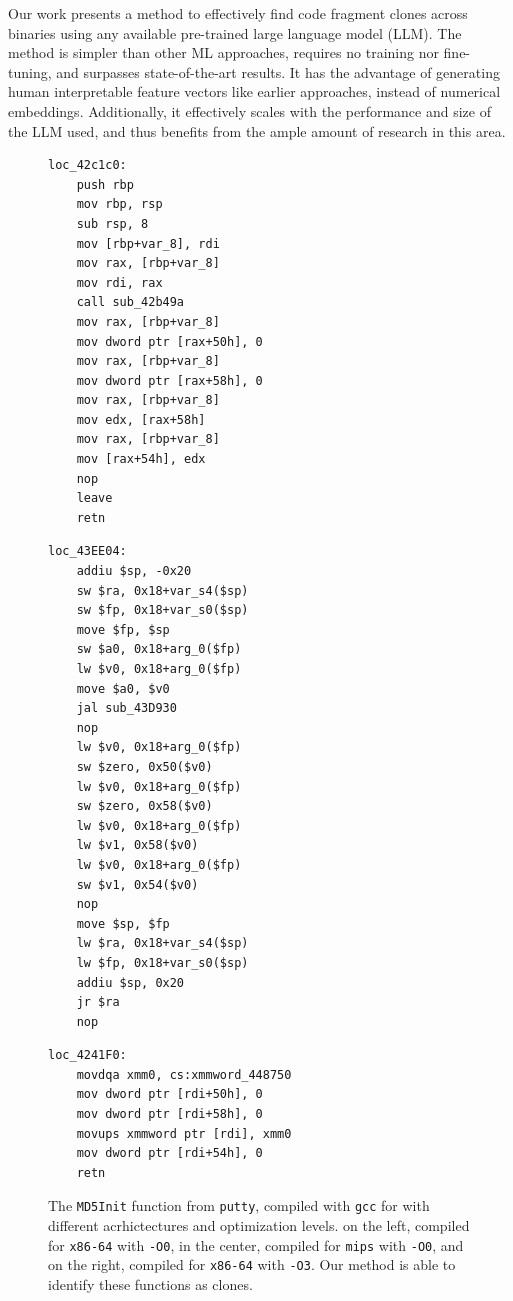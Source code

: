 Our work presents a method to effectively find code fragment clones across binaries using any available pre-trained
large language model (LLM). The method is simpler than other ML approaches, requires no training nor fine-tuning, and
surpasses state-of-the-art results. It has the advantage of generating human interpretable feature vectors like earlier approaches,
instead of numerical embeddings. Additionally, it effectively scales with the performance and size of the LLM used, and thus
benefits from the ample amount of research in this area.

\begin{figure}
\centering
\begin{minipage}[t]{0.32\linewidth}
\centering
\begin{verbatim}
loc_42c1c0:
    push rbp
    mov rbp, rsp
    sub rsp, 8
    mov [rbp+var_8], rdi
    mov rax, [rbp+var_8]
    mov rdi, rax
    call sub_42b49a
    mov rax, [rbp+var_8]
    mov dword ptr [rax+50h], 0
    mov rax, [rbp+var_8]
    mov dword ptr [rax+58h], 0
    mov rax, [rbp+var_8]
    mov edx, [rax+58h]
    mov rax, [rbp+var_8]
    mov [rax+54h], edx
    nop 
    leave 
    retn 
\end{verbatim}
\end{minipage}
\hfill
\begin{minipage}[t]{0.32\linewidth}
\centering
\begin{verbatim}
loc_43EE04:
    addiu $sp, -0x20
    sw $ra, 0x18+var_s4($sp)
    sw $fp, 0x18+var_s0($sp)
    move $fp, $sp
    sw $a0, 0x18+arg_0($fp)
    lw $v0, 0x18+arg_0($fp)
    move $a0, $v0
    jal sub_43D930
    nop 
    lw $v0, 0x18+arg_0($fp)
    sw $zero, 0x50($v0)
    lw $v0, 0x18+arg_0($fp)
    sw $zero, 0x58($v0)
    lw $v0, 0x18+arg_0($fp)
    lw $v1, 0x58($v0)
    lw $v0, 0x18+arg_0($fp)
    sw $v1, 0x54($v0)
    nop 
    move $sp, $fp
    lw $ra, 0x18+var_s4($sp)
    lw $fp, 0x18+var_s0($sp)
    addiu $sp, 0x20
    jr $ra
    nop 
\end{verbatim}
\end{minipage}
\begin{minipage}[t]{0.32\linewidth}
\centering
\begin{verbatim}
loc_4241F0:
    movdqa xmm0, cs:xmmword_448750
    mov dword ptr [rdi+50h], 0
    mov dword ptr [rdi+58h], 0
    movups xmmword ptr [rdi], xmm0
    mov dword ptr [rdi+54h], 0
    retn
\end{verbatim}
\end{minipage}
\caption{The \texttt{MD5Init} function from \texttt{putty}, compiled with \texttt{gcc} for with different acrhictectures and optimization levels.
    on the left, compiled for \texttt{x86-64} with \texttt{-O0}, in the center, compiled for \texttt{mips} with \texttt{-O0}, and on the right,
    compiled for \texttt{x86-64} with \texttt{-O3}.  Our method is able to identify these functions as clones.}
\label{asm-diff}
\end{figure}


